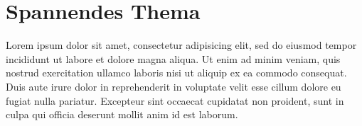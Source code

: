 \documentclass[10pt,a4paper,compsoc]{IEEEtran}
\begin{document}
\section{Spannendes Thema}

Lorem ipsum dolor sit amet, consectetur adipisicing elit, sed do eiusmod tempor incididunt ut labore et dolore magna aliqua. Ut enim ad minim veniam, quis nostrud exercitation ullamco laboris nisi ut aliquip ex ea commodo consequat. Duis aute irure dolor in reprehenderit in voluptate velit esse cillum dolore eu fugiat nulla pariatur. Excepteur sint occaecat cupidatat non proident, sunt in culpa qui officia deserunt mollit anim id est laborum.



\end{document}
